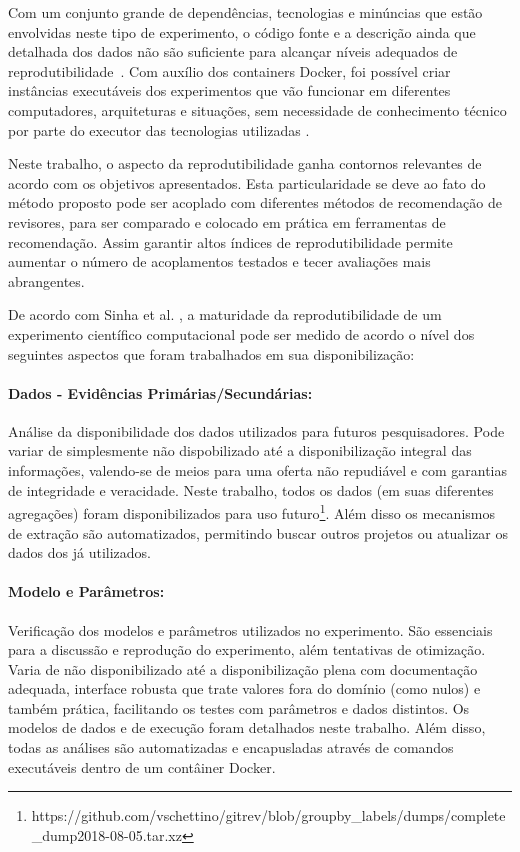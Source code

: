 \documentclass[peerreview]{acmart}
\begin{document}
Com um conjunto grande de dependências, tecnologias e minúncias que estão envolvidas neste tipo de experimento, o código fonte e a descrição ainda que detalhada dos dados não são suficiente para alcançar níveis adequados de reprodutibilidade~\cite{ince2012}. Com auxílio dos containers Docker, foi possível criar instâncias executáveis dos experimentos que vão funcionar em diferentes computadores, arquiteturas e situações, sem necessidade de conhecimento técnico por parte do executor das tecnologias utilizadas \cite{boettiger2015}.

Neste trabalho, o aspecto da reprodutibilidade ganha contornos relevantes de acordo com os objetivos apresentados. Esta particularidade se deve ao fato do método proposto pode ser acoplado com diferentes métodos de recomendação de revisores, para ser comparado e colocado em prática em ferramentas de recomendação. Assim garantir altos índices de reprodutibilidade permite aumentar o número de acoplamentos testados e tecer avaliações mais abrangentes.

De acordo com Sinha et al. \cite{sinha2016}, a maturidade da reprodutibilidade de um experimento científico computacional pode ser medido de acordo o nível dos seguintes aspectos que foram trabalhados em sua disponibilização:

\paragraph{Dados - Evidências Primárias/Secundárias:} Análise da disponibilidade dos dados utilizados para futuros pesquisadores. Pode variar de simplesmente não dispobilizado até a disponibilização integral das informações, valendo-se de meios para uma oferta não repudiável e com garantias de integridade e veracidade. Neste trabalho, todos os dados (em suas diferentes agregações) foram disponibilizados para uso futuro\footnote{https://github.com/vschettino/gitrev/blob/groupby\_labels/dumps/complete\_dump2018-08-05.tar.xz}. Além disso os mecanismos de extração são automatizados, permitindo buscar outros projetos ou atualizar os dados dos já utilizados.

\paragraph{Modelo e Parâmetros:} Verificação dos modelos e parâmetros utilizados no experimento. São essenciais para a discussão e reprodução do experimento, além tentativas de otimização. Varia de não disponibilizado até a disponibilização plena com documentação adequada, interface robusta que trate valores fora do domínio (como nulos) e também prática, facilitando os testes com parâmetros e dados distintos. Os modelos de dados e de execução foram detalhados neste trabalho. Além disso, todas as análises são automatizadas e encapusladas através de comandos executáveis dentro de um contâiner Docker.
\end{document}
